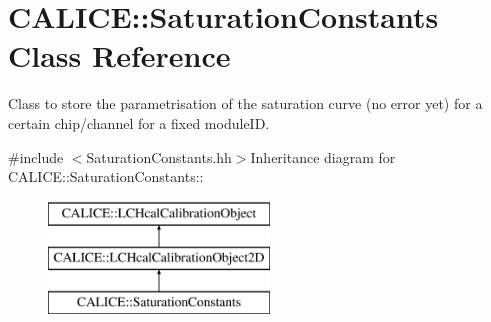 \section{CALICE::SaturationConstants Class Reference}
\label{classCALICE_1_1SaturationConstants}


Class to store the parametrisation of the saturation curve (no error yet) for a certain chip/channel for a fixed moduleID.  


{\ttfamily \#include $<$SaturationConstants.hh$>$}Inheritance diagram for CALICE::SaturationConstants::\begin{figure}[H]
\begin{center}
\leavevmode
\includegraphics[height=3cm]{classCALICE_1_1SaturationConstants}
\end{center}
\end{figure}
